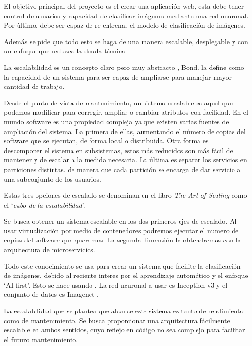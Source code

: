 El objetivo principal del proyecto es el crear una aplicación web, esta debe tener control de usuarios y capacidad de clasificar imágenes mediante una red neuronal. Por último, debe ser capaz de re-entrenar el modelo de clasificación de imágenes.

Además se pide que todo esto se haga de una manera escalable, desplegable y con un enfoque que reduzca la deuda técnica.

La escalabilidad es un concepto claro pero muy abstracto \cite{hill90}, Bondi \cite{bondi00} la define como la capacidad de un sistema para ser capaz de ampliarse para manejar mayor cantidad de trabajo. 

Desde el punto de vista de mantenimiento, un sistema escalable es aquel que podemos modificar para corregir, ampliar o cambiar atributos con facilidad. En el mundo software es una propiedad compleja ya que existen varias fuentes de ampliación del sistema. La primera de ellas, aumentando el número de copias del software que se ejecutan, de forma local o distribuida. Otra forma es descomponer el sistema en subsistemas, estos más reducidos son más fácil de mantener y de escalar a la medida necesaria. La última es separar los servicios en particiones distintas, de manera que cada partición se encarga de dar servicio a una subconjunto de los usuarios.

Estas tres opciones de escalado se denominan en el libro \emph{The Art of Scaling} \cite{scala09} como el `\emph{cubo de la escalabilidad}'. 

Se busca obtener un sistema escalable en los dos primeros ejes de escalado. Al usar virtualización por medio de contenedores podremos ejecutar el numero de copias del software que queramos. La segunda dimensión la obtendremos con la arquitectura de microservicios. 

Todo este conocimiento se usa para crear un sistema que facilite la clasificación de imágenes, debido al reciente interes por el aprendizaje automático y el enfoque `AI first'. Esto se hace usando  \cite{tf}. La red neuronal a usar es Inception v3 \cite{incep} y el conjunto de datos es Imagenet \cite{imnet}.

La escalabilidad que se plantea que alcance este sistema es tanto de rendimiento como de mantenimiento. Se busca proporcionar una arquitectura fácilmente escalable en ambos sentidos, cuyo reflejo en código no sea complejo  para facilitar el futuro mantenimiento. 